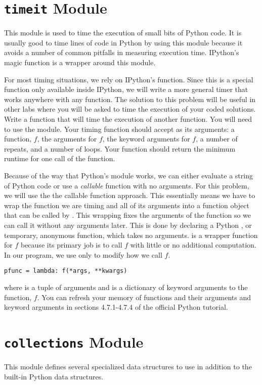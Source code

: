 \section*{\texttt{timeit} Module}
This module is used to time the execution of small bits of Python code.
It is usually good to time lines of code in Python by using this module because it avoids a number of common pitfalls in measuring execution time.
IPython's  magic function is a wrapper around this module.

\begin{problem}
For most timing situations, we rely on IPython's  function.
Since this is a special function only available inside IPython, we will write a more general timer that works anywhere with any function.
The solution to this problem will be useful in other labs where you will be asked to time the execution of your coded solutions.
Write a function that will time the execution of another function.
You will need to use the  module.
Your timing function should accept as its arguments: a function, $f$, the arguments for $f$, the keyword arguments for $f$, a number of repeats, and a number of loops.
Your function should return the minimum runtime for one call of the function.

Because of the way that Python's  module works, we can either evaluate a string of Python code or use a \emph{callable} function with no arguments.  
For this problem, we will use the the callable function approach.
This essentially means we have to wrap the function we are timing and all of its arguments into a function object that can be called by .
This wrapping fixes the arguments of the function so we can call it without any arguments later.
This is done by declaring a Python , or temporary, anonymous  function, which takes no arguments.   is a wrapper function for $f$ because its primary job is to call $f$ with little or no additional computation.
In our program, we use  only to modify how we call $f$.
\begin{lstlisting}
pfunc = lambda: f(*args, **kwargs)
\end{lstlisting}
where  is a tuple of arguments and  is a dictionary of keyword arguments to the function, $f$.
You can refresh your memory of functions and their arguments and keyword arguments in sections 4.7.1-4.7.4 of the official Python tutorial.
\end{problem}

\section*{\texttt{collections} Module}
This module defines several specialized data structures to use in addition to the built-in Python data structures.

